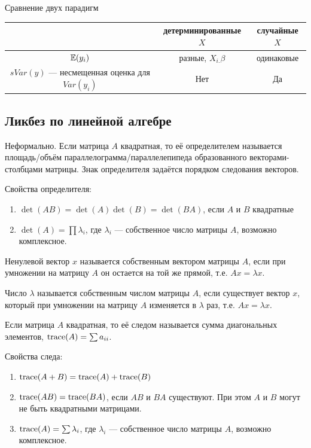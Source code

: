 \documentclass[12pt, a4paper]{article}\usepackage[]{graphicx}\usepackage[]{color}
\begin{document}
Сравнение двух парадигм

\begin{tabular}{c|cc}
\toprule
 & детерминированные $X$  & случайные $X$ \\
\midrule
$\mathbb{E}(y_i)$ & разные, $X_{i.}\beta$ & одинаковые \\
$sVar(y)$ — несмещенная оценка для $Var(y_i)$ & Нет & Да \\
\bottomrule
\end{tabular}



\subsection{Ликбез по линейной алгебре}

\begin{definition}
Неформально. Если матрица $A$ квадратная, то её определителем называется площадь/объём параллелограмма/параллелепипеда образованного векторами-столбцами матрицы. Знак определителя задаётся порядком следования векторов.
\end{definition}


Свойства определителя:
\begin{enumerate}
\item $\det(AB)=\det(A)\det(B)=\det(BA)$, если $A$ и $B$ квадратные
\item $\det(A)=\prod \lambda_i$, где $\lambda_i$ — собственное число матрицы $A$, возможно комплексное.
\end{enumerate}


\begin{definition}
Ненулевой вектор $x$ называется собственным вектором матрицы $A$, если при умножении на матрицу $A$ он остается на той же прямой, т.е. $Ax=\lambda x$.
\end{definition}

\begin{definition}
Число $\lambda$ называется собственным числом матрицы $A$, если существует вектор $x$, который при умножении на матрицу $A$ изменяется в $\lambda$ раз, т.е. $Ax=\lambda x$.
\end{definition}

\begin{definition}
Если матрица $A$ квадратная, то её следом называется сумма диагональных элементов, $\operatorname{trace}(A)=\sum a_{ii}$.
\end{definition}

Свойства следа:
\begin{enumerate}
\item $\operatorname{trace}(A+B)=\operatorname{trace}(A)+\operatorname{trace}(B)$
\item $\operatorname{trace}(AB)=\operatorname{trace}(BA)$, если $AB$ и $BA$ существуют. При этом $A$ и $B$ могут не быть квадратными матрицами.
\item $\operatorname{trace}(A)=\sum \lambda_i$, где $\lambda_i$ — собственное число матрицы $A$, возможно комплексное.
\end{enumerate}
\end{document}
